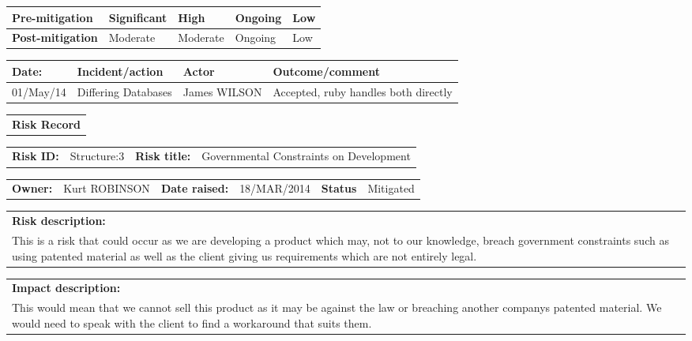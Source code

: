 \begin{table}
\begin{tabularx}{\textwidth}{| l | l | X | X | X |}
		\textbf{Pre-mitigation} & Significant & High & Ongoing & Low \\ \hline
		\textbf{Post-mitigation} & Moderate & Moderate & Ongoing & Low \\ \hline \hline
	\end{tabularx}
	\begin{tabularx}{\textwidth}{| l | X | l | X |}
		\hline
		\textbf{Date:} & \textbf{Incident/action} & \textbf{Actor} & \textbf{Outcome/comment} \\ \hline
		01/May/14 & Differing Databases & James WILSON & Accepted, ruby handles both directly  \\ \hline
	\end{tabularx}%
\end{table}

\begin{table}
	\begin{tabularx}{\textwidth}{| X |}
		\hline
		\textbf{Risk Record} \\
	\end{tabularx}
	\begin{tabularx}{\textwidth}{| l | X | l | X |}
		\hline
		\textbf{Risk ID:} & Structure:3 & \textbf{Risk title:} & Governmental Constraints on Development  \\
	\end{tabularx}
	\begin{tabularx}{\textwidth}{| l | X | l | X | l | X |}
		\hline
		\textbf{Owner:} & Kurt ROBINSON & \textbf{Date raised:} & 18/MAR/2014 & \textbf{Status} & Mitigated \\
	\end{tabularx}
	\begin{tabularx}{\textwidth}{| X |}
		\hline
		\textbf{Risk description:} \\ This is a risk that could occur as we are developing a product which may, not to our knowledge, breach government constraints such as using patented material as well as the client giving us requirements which are not entirely legal. \\
	\end{tabularx}
	\begin{tabularx}{\textwidth}{| X |}
		\hline
		\textbf{Impact description:} \\ This would mean that we cannot sell this product as it may be against the law or breaching another companys patented material. We would need to speak with the client to find a workaround that suits them. \\

\end{tabularx}
\end{table}
